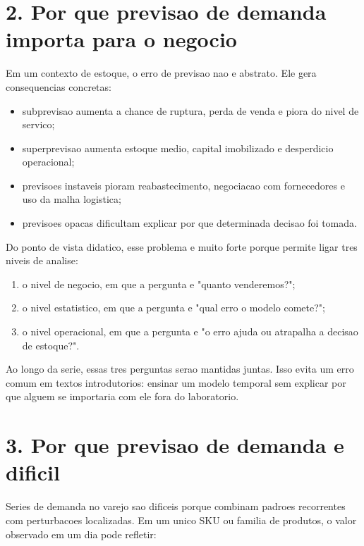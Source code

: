 \documentclass[12pt]{article}
\providecommand{\tightlist}{%
  \setlength{\itemsep}{0pt}\setlength{\parskip}{0pt}}
\begin{document}
\section{2. Por que previsao de demanda importa para o negocio}\label{2-por-que-previsao-de-demanda-importa-para-o-negocio}

Em um contexto de estoque, o erro de previsao nao e abstrato. Ele gera consequencias concretas:

\begin{itemize}
\tightlist
\item
  subprevisao aumenta a chance de ruptura, perda de venda e piora do nivel de servico;
\item
  superprevisao aumenta estoque medio, capital imobilizado e desperdicio operacional;
\item
  previsoes instaveis pioram reabastecimento, negociacao com fornecedores e uso da malha logistica;
\item
  previsoes opacas dificultam explicar por que determinada decisao foi tomada.
\end{itemize}

Do ponto de vista didatico, esse problema e muito forte porque permite ligar tres niveis de analise:

\begin{enumerate}
\def\labelenumi{\arabic{enumi}.}
\tightlist
\item
  o nivel de negocio, em que a pergunta e "quanto venderemos?";
\item
  o nivel estatistico, em que a pergunta e "qual erro o modelo comete?";
\item
  o nivel operacional, em que a pergunta e "o erro ajuda ou atrapalha a decisao de estoque?".
\end{enumerate}

Ao longo da serie, essas tres perguntas serao mantidas juntas. Isso evita um erro comum em textos introdutorios: ensinar um modelo temporal sem explicar por que alguem se importaria com ele fora do laboratorio.

\section{3. Por que previsao de demanda e dificil}\label{3-por-que-previsao-de-demanda-e-dificil}

Series de demanda no varejo sao dificeis porque combinam padroes recorrentes com perturbacoes localizadas. Em um unico SKU ou familia de produtos, o valor observado em um dia pode refletir:
\end{document}
